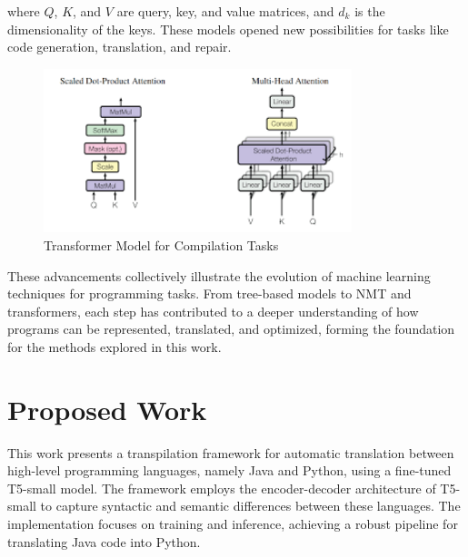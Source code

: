 \documentclass{dhbenelux}
\begin{document}
where \( Q \), \( K \), and \( V \) are query, key, and value matrices, and \( d_k \) is the dimensionality of the keys. These models opened new possibilities for tasks like code generation, translation, and repair.

\begin{figure}[h]
    \centering
    \includegraphics[width=0.8\textwidth]{Images/5.png} %
    \caption{Transformer Model for Compilation Tasks}
    \label{fig:transformer-code}
\end{figure}

These advancements collectively illustrate the evolution of machine learning techniques for programming tasks. From tree-based models to NMT and transformers, each step has contributed to a deeper understanding of how programs can be represented, translated, and optimized, forming the foundation for the methods explored in this work.



\section{Proposed Work}

This work presents a transpilation framework for automatic translation between high-level programming languages, namely Java and Python, using a fine-tuned T5-small model. The framework employs the encoder-decoder architecture of T5-small to capture syntactic and semantic differences between these languages. The implementation focuses on training and inference, achieving a robust pipeline for translating Java code into Python.
\end{document}
